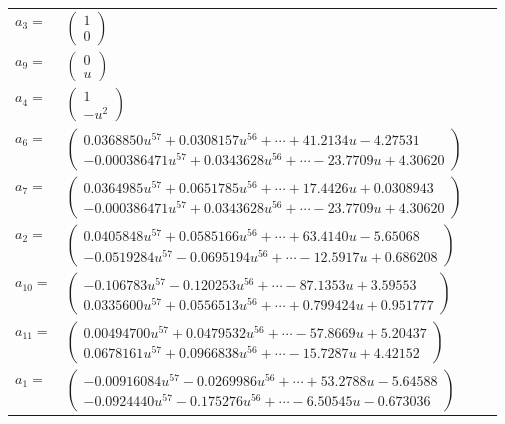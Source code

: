\documentclass[1p]{elsarticle_modified}
\theoremstyle{definition}
\begin{document}
\begin{tabular}{m{7pt} m{180pt} m{7pt} m{180pt} }
\flushright $a_{3}=$&$\begin{pmatrix}1\\0\end{pmatrix}$ \\
\flushright $a_{9}=$&$\begin{pmatrix}0\\u\end{pmatrix}$ \\
\flushright $a_{4}=$&$\begin{pmatrix}1\\- u^2\end{pmatrix}$ \\
\flushright $a_{6}=$&$\begin{pmatrix}0.0368850 u^{57}+0.0308157 u^{56}+\cdots+41.2134 u-4.27531\\-0.000386471 u^{57}+0.0343628 u^{56}+\cdots-23.7709 u+4.30620\end{pmatrix}$ \\
\flushright $a_{7}=$&$\begin{pmatrix}0.0364985 u^{57}+0.0651785 u^{56}+\cdots+17.4426 u+0.0308943\\-0.000386471 u^{57}+0.0343628 u^{56}+\cdots-23.7709 u+4.30620\end{pmatrix}$ \\
\flushright $a_{2}=$&$\begin{pmatrix}0.0405848 u^{57}+0.0585166 u^{56}+\cdots+63.4140 u-5.65068\\-0.0519284 u^{57}-0.0695194 u^{56}+\cdots-12.5917 u+0.686208\end{pmatrix}$ \\
\flushright $a_{10}=$&$\begin{pmatrix}-0.106783 u^{57}-0.120253 u^{56}+\cdots-87.1353 u+3.59553\\0.0335600 u^{57}+0.0556513 u^{56}+\cdots+0.799424 u+0.951777\end{pmatrix}$ \\
\flushright $a_{11}=$&$\begin{pmatrix}0.00494700 u^{57}+0.0479532 u^{56}+\cdots-57.8669 u+5.20437\\0.0678161 u^{57}+0.0966838 u^{56}+\cdots-15.7287 u+4.42152\end{pmatrix}$ \\
\flushright $a_{1}=$&$\begin{pmatrix}-0.00916084 u^{57}-0.0269986 u^{56}+\cdots+53.2788 u-5.64588\\-0.0924440 u^{57}-0.175276 u^{56}+\cdots-6.50545 u-0.673036\end{pmatrix}$ \\

\end{tabular}
\end{document}
